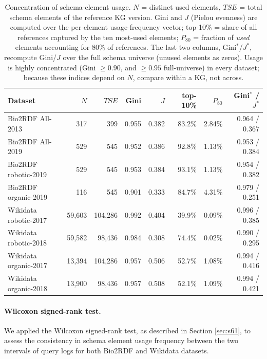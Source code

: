 \documentclass[sw]{iosart2x}
\begin{document}
\begin{table}[ht]
\centering
\caption{Concentration of schema-element usage. $N$ = distinct used elements, $TSE$ = total schema elements of the reference KG version. Gini and $J$ (Pielou evenness) are computed over the per-element usage-frequency vector; top-10\% = share of all references captured by the ten most-used elements; $P_{80}$ = fraction of \emph{used} elements accounting for 80\% of references. The last two columns, Gini$^{\ast}$/$J^{\ast}$, recompute Gini/$J$ over the full schema universe (unused elements as zeros). Usage is highly concentrated (Gini $\geq 0.90$, and $\geq 0.95$ full-universe) in every dataset; because these indices depend on $N$, compare within a KG, not across.}
\label{tab:concentration}
\begin{tabular}{l|r|r|r|r|r|r|r}
\hline
Dataset & $N$ & $TSE$ & Gini & $J$ & top-10\% & $P_{80}$ & Gini$^{\ast}$ / $J^{\ast}$ \\
\hline
Bio2RDF All-2013 & 317 & 399 & 0.955 & 0.382 & 83.2\% & 2.84\% & 0.964 / 0.367 \\
Bio2RDF All-2019 & 529 & 545 & 0.952 & 0.386 & 92.8\% & 1.13\% & 0.953 / 0.384 \\
Bio2RDF robotic-2019 & 529 & 545 & 0.953 & 0.384 & 93.1\% & 1.13\% & 0.954 / 0.382 \\
Bio2RDF organic-2019 & 116 & 545 & 0.901 & 0.333 & 84.7\% & 4.31\% & 0.979 / 0.251 \\
Wikidata robotic-2017 & 59{,}603 & 104{,}286 & 0.992 & 0.404 & 39.9\% & 0.09\% & 0.996 / 0.385 \\
Wikidata robotic-2018 & 59{,}582 & 98{,}436 & 0.984 & 0.308 & 74.4\% & 0.02\% & 0.990 / 0.295 \\
Wikidata organic-2017 & 13{,}394 & 104{,}286 & 0.957 & 0.506 & 52.7\% & 1.08\% & 0.994 / 0.416 \\
Wikidata organic-2018 & 13{,}900 & 98{,}436 & 0.957 & 0.508 & 52.1\% & 1.09\% & 0.994 / 0.421 \\
\hline
\end{tabular}
\end{table}

\paragraph{\textbf{Wilcoxon signed-rank test.}}We applied the Wilcoxon signed-rank test, as described in Section \ref{sec:s61}, to assess the consistency in schema element usage frequency between the two intervals of query logs for both Bio2RDF and Wikidata datasets.
\end{document}
